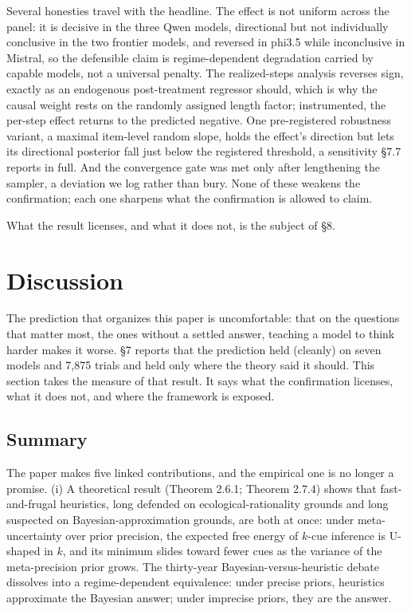 \documentclass{article}
\begin{document}
Several honesties travel with the headline. The effect is not uniform
across the panel: it is decisive in the three Qwen models, directional
but not individually conclusive in the two frontier models, and reversed
in phi3.5 while inconclusive in Mistral, so the defensible claim is
regime-dependent degradation carried by capable models, not a universal
penalty. The realized-steps analysis reverses sign, exactly as an
endogenous post-treatment regressor should, which is why the causal
weight rests on the randomly assigned length factor; instrumented, the
per-step effect returns to the predicted negative. One pre-registered
robustness variant, a maximal item-level random slope, holds the
effect's direction but lets its directional posterior fall just below
the registered threshold, a sensitivity \S{}7.7 reports in full. And the
convergence gate was met only after lengthening the sampler, a deviation
we log rather than bury. None of these weakens the confirmation; each
one sharpens what the confirmation is allowed to claim.

What the result licenses, and what it does not, is the subject of \S{}8.

\section{Discussion}\label{chapter-8-discussion}

The prediction that organizes this paper is uncomfortable: that on the
questions that matter most, the ones without a settled answer, teaching
a model to think harder makes it worse. \S{}7 reports that the prediction
held (cleanly) on seven models and 7,875 trials and held only where the
theory said it should. This section takes the measure of that result. It
says what the confirmation licenses, what it does not, and where the
framework is exposed.

\subsection{Summary}\label{summary-3}

The paper makes five linked contributions, and the empirical one is no
longer a promise. (i) A theoretical result (Theorem 2.6.1; Theorem
2.7.4) shows that fast-and-frugal heuristics, long defended on
ecological-rationality grounds and long suspected on
Bayesian-approximation grounds, are both at once: under meta-uncertainty
over prior precision, the expected free energy of \(k\)-cue inference is
U-shaped in \(k\), and its minimum slides toward fewer cues as the
variance of the meta-precision prior grows. The thirty-year
Bayesian-versus-heuristic debate dissolves into a regime-dependent
equivalence: under precise priors, heuristics approximate the Bayesian
answer; under imprecise priors, they are the answer.
\end{document}
